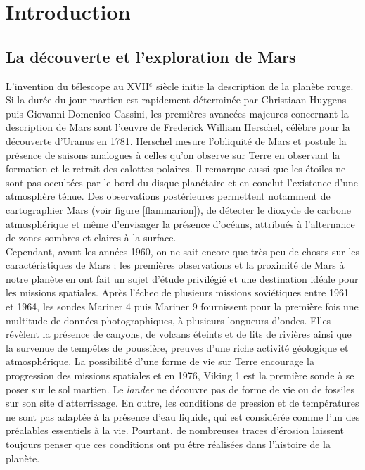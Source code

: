 \documentclass[11pt,a4paper]{article}
\begin{document}
\clearpage
\tableofcontents
\newpage
\thispagestyle{empty}
\hfill
\newpage
\addtocounter{page}{-1}

\clearpage
\section{Introduction}

\subsection{La découverte et l'exploration de Mars}
L'invention du télescope au XVII$^{e}$ siècle initie la description de la planète rouge. Si la durée du jour martien est rapidement déterminée par Christiaan Huygens puis Giovanni Domenico Cassini, les premières avancées majeures concernant la description de Mars sont l'\oe uvre de Frederick William Herschel, célèbre pour la découverte d'Uranus en 1781. Herschel mesure l'obliquité de Mars et postule la présence de saisons analogues à celles qu'on observe sur Terre en observant la formation et le retrait des calottes polaires. Il remarque aussi que les étoiles ne sont pas occultées par le bord du disque planétaire et en conclut l'existence d'une atmosphère ténue. Des observations postérieures permettent notamment de cartographier Mars (voir figure \ref{flammarion}), de détecter le dioxyde de carbone atmosphérique et même d'envisager la présence d'océans, attribués à l'alternance de zones sombres et claires à la surface. \\ 

Cependant, avant les années 1960, on ne sait encore que très peu de choses sur les caractéristiques de Mars ; les premières observations  et la proximité de Mars à notre planète en ont fait un sujet d'étude privilégié et une destination idéale pour les missions spatiales. Après l'échec de plusieurs missions soviétiques entre 1961 et 1964, les sondes Mariner 4 puis Mariner 9 fournissent pour la première fois une multitude de données photographiques, à plusieurs longueurs d'ondes. Elles révèlent la présence de canyons, de volcans éteints et de lits de rivières ainsi que la survenue de tempêtes de poussière, preuves d'une riche activité géologique et atmosphérique. La possibilité d'une forme de vie sur Terre encourage la progression des missions spatiales et en 1976, Viking 1 est la première sonde à se poser sur  le sol martien. Le \emph{lander} ne découvre pas de forme de vie ou de fossiles sur son site d'atterrissage. En outre, les conditions de pression et de températures ne sont pas adaptée à la présence d'eau liquide, qui est considérée comme l'un des préalables essentiels à la vie. Pourtant, de nombreuses traces d'érosion laissent toujours penser que ces conditions ont pu être réalisées dans l'histoire de la planète. \\ 
\end{document}
